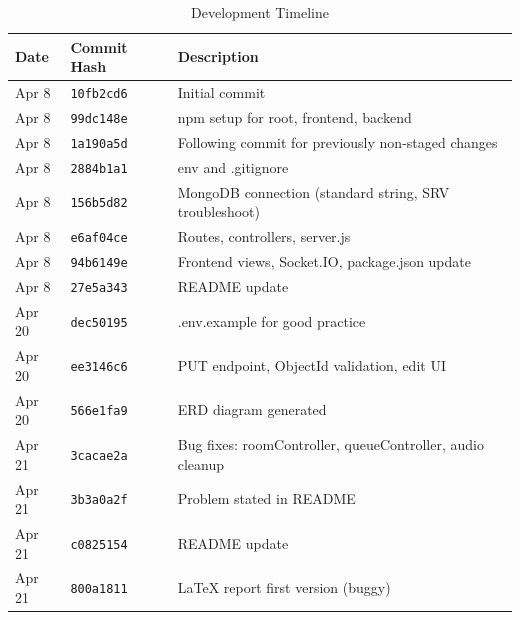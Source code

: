 \documentclass[11pt,a4paper]{article}
\begin{document}
\begin{table}[H]
\centering
\begin{tabular}{|p{3cm}|p{5cm}|p{4cm}|}
\hline
\textbf{Date} & \textbf{Commit Hash} & \textbf{Description} \\
\hline
Apr 8 & \texttt{10fb2cd6} & Initial commit \\
Apr 8 & \texttt{99dc148e} & npm setup for root, frontend, backend \\
Apr 8 & \texttt{1a190a5d} & Following commit for previously non-staged changes \\
Apr 8 & \texttt{2884b1a1} & env and .gitignore \\
Apr 8 & \texttt{156b5d82} & MongoDB connection (standard string, SRV troubleshoot) \\
Apr 8 & \texttt{e6af04ce} & Routes, controllers, server.js \\
Apr 8 & \texttt{94b6149e} & Frontend views, Socket.IO, package.json update \\
Apr 8 & \texttt{27e5a343} & README update \\
Apr 20 & \texttt{dec50195} & .env.example for good practice \\
Apr 20 & \texttt{ee3146c6} & PUT endpoint, ObjectId validation, edit UI \\
Apr 20 & \texttt{566e1fa9} & ERD diagram generated \\
Apr 21 & \texttt{3cacae2a} & Bug fixes: roomController, queueController, audio cleanup \\
Apr 21 & \texttt{3b3a0a2f} & Problem stated in README \\
Apr 21 & \texttt{c0825154} & README update \\
Apr 21 & \texttt{800a1811} & LaTeX report first version (buggy) \\
\hline
\end{tabular}
\caption{Development Timeline}
\end{table}
\end{document}
